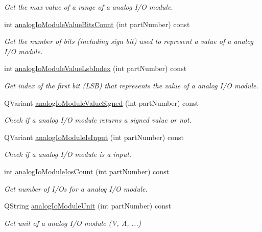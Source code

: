 \begin{DoxyCompactItemize}
\begin{DoxyCompactList}\small\item\em Get the max value of a range of a analog I/O module. \end{DoxyCompactList}\item 
int \hyperlink{classmdt_device_modbus_wago_a9b991f58c2cffba8c7dcdaf347495655}{analogIoModuleValueBitsCount} (int partNumber) const 
\begin{DoxyCompactList}\small\item\em Get the number of bits (including sign bit) used to represent a value of a analog I/O module. \end{DoxyCompactList}\item 
int \hyperlink{classmdt_device_modbus_wago_ad463bb479d6270dc3124a978e30b1231}{analogIoModuleValueLsbIndex} (int partNumber) const 
\begin{DoxyCompactList}\small\item\em Get index of the first bit (LSB) that represents the value of a analog I/O module. \end{DoxyCompactList}\item 
QVariant \hyperlink{classmdt_device_modbus_wago_abc8b4190ba582f545a9178fec07d9f75}{analogIoModuleValueSigned} (int partNumber) const 
\begin{DoxyCompactList}\small\item\em Check if a analog I/O module returns a signed value or not. \end{DoxyCompactList}\item 
QVariant \hyperlink{classmdt_device_modbus_wago_ae52341831cea60bd89471352b16e9eaa}{analogIoModuleIsInput} (int partNumber) const 
\begin{DoxyCompactList}\small\item\em Check if a analog I/O module is a input. \end{DoxyCompactList}\item 
int \hyperlink{classmdt_device_modbus_wago_a0d7cafa60ab353363ccd8127ab8ad084}{analogIoModuleIosCount} (int partNumber) const 
\begin{DoxyCompactList}\small\item\em Get number of I/Os for a analog I/O module. \end{DoxyCompactList}\item 
QString \hyperlink{classmdt_device_modbus_wago_a7c8333a5f74412a8ff0ad366387df96b}{analogIoModuleUnit} (int partNumber) const 
\begin{DoxyCompactList}\small\item\em Get unit of a analog I/O module (V, A, ...) \end{DoxyCompactList}\item 

\end{DoxyCompactItemize}
